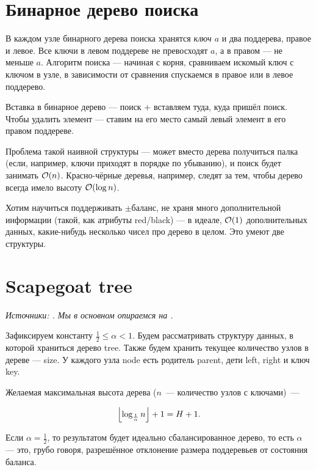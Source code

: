 \section{Бинарное дерево поиска}

В каждом узле бинарного дерева поиска хранятся {\it ключ $a$} и два поддерева, правое и левое. Все ключи в левом поддереве не превосходят $a$, а в правом — не меньше $a$. Алгоритм поиска — начиная с корня, сравниваем искомый ключ с ключом в узле, в зависимости от сравнения спускаемся в правое или в левое поддерево.

Вставка в бинарное дерево — поиск $+$ вставляем туда, куда пришёл поиск. Чтобы удалить элемент --- ставим на его место самый левый элемент в его правом поддереве.

Проблема такой наивной структуры — может вместо дерева получиться палка (если, например, ключи приходят в порядке по убыванию), и поиск будет занимать $\BigO(n)$. Красно-чёрные деревья, например, следят за тем, чтобы дерево всегда имело высоту $\BigO(\log n)$.

Хотим научиться поддерживать $\pm$баланс, не храня много дополнительной информации (такой, как атрибуты red/black) — в идеале, $\BigO(1)$ дополнительных данных, какие-нибудь несколько чисел про дерево в целом. Это умеют две структуры.

\section{Scapegoat tree}

{\it Источники: \cite{galperin1993scapegoat,andersson1989improving}. Мы в основном опираемся на \cite{galperin1993scapegoat}.}

Зафиксируем константу $\frac{1}{2} \le \alpha < 1$. Будем рассматривать структуру данных, в которой храниться дерево tree. Также будем хранить текущее количество узлов в дереве — size. У каждого узла node есть родитель parent, дети left, right и ключ key.

Желаемая максимальная высота дерева ($n$~— количество узлов с ключами)~—

\begin{equation*}
	\floor*{ \log_{\frac{1}{\alpha}} n } + 1 = H + 1.
\end{equation*}


Если $\alpha = \frac{1}{2}$, то результатом будет идеально сбалансированное дерево, то есть $\alpha$ — это, грубо говоря, разрешённое отклонение размера поддеревьев от состояния баланса.

